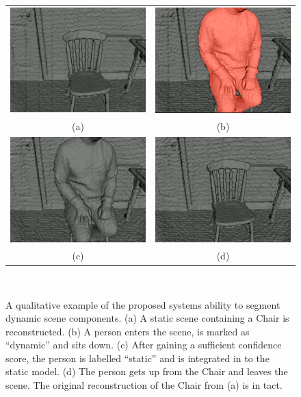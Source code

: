 \begin{figure}[!htbp]
  \centering
  \begin{tabular}{cc}
    \includegraphics[height=.25\linewidth]{figures/moseg/chair0.png} &
    \includegraphics[height=.25\linewidth]{figures/moseg/chair1.png} \\
    (a) & (b) \\
    \includegraphics[height=.25\linewidth]{figures/moseg/chair2.png} &
    \includegraphics[height=.25\linewidth]{figures/moseg/chair3.png} \\
    (c) & (d)
  \end{tabular}
  \caption[Motion Segmentation Qualitative Results II]
  {A qualitative example of the proposed systems ability to segment
    dynamic scene components.
    (a) A static scene containing a Chair is reconstructed.
    (b) A person enters the scene, is marked as ``dynamic'' and sits down.
    (c) After gaining a sufficient confidence score, the person is labelled
    ``static'' and is integrated in to the static model.
    (d) The person gets up from the Chair and leaves the scene. The original
    reconstruction of the Chair from (a) is in tact.}
~\label{figure:moseg_qualitative_chair}
\end{figure}

